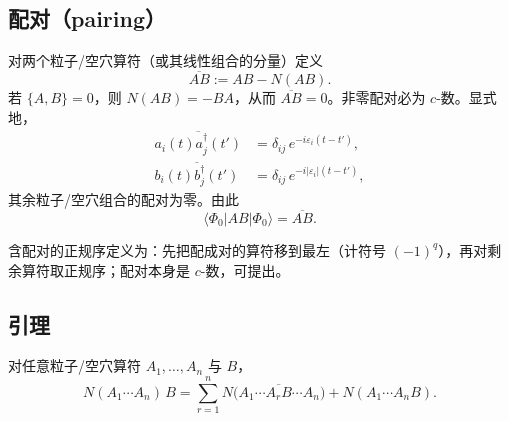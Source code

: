\subsection{配对（pairing）}

对两个粒子/空穴算符（或其线性组合的分量）定义
\begin{equation}
  \overline{AB}
  :=AB-N(AB).
\label{eq:pairing}
\end{equation}
若 $\{A,B\}=0$，则 $N(AB)=-BA$，从而 $\overline{AB}=0$。非零配对必为 $c$-数。显式地，
\begin{equation}
\begin{aligned}
  \overline{a_i(t)a_j^\dagger(t')}
  &=\delta_{ij}\,e^{-i\varepsilon_i(t-t')},\\
  \overline{b_i(t)b_j^\dagger(t')}
  &=\delta_{ij}\,e^{-i|\varepsilon_i|(t-t')},
\end{aligned}
\end{equation}
其余粒子/空穴组合的配对为零。由此
\begin{equation}
  \langle\Phi_0|AB|\Phi_0\rangle
  =\overline{AB}.
\end{equation}

含配对的正规序定义为：先把配成对的算符移到最左（计符号 $(-1)^q$），再对剩余算符取正规序；配对本身是 $c$-数，可提出。

\subsection{引理}

\begin{lemma}
对任意粒子/空穴算符 $A_1,\ldots,A_n$ 与 $B$，
\begin{equation}
  N(A_1\cdots A_n)\,B
  =\sum_{r=1}^n
  N\bigl(A_1\cdots\overline{A_r B}\cdots A_n\bigr)
  +N(A_1\cdots A_n B).
\label{eq:wick_lemma}
\end{equation}
\end{lemma}

